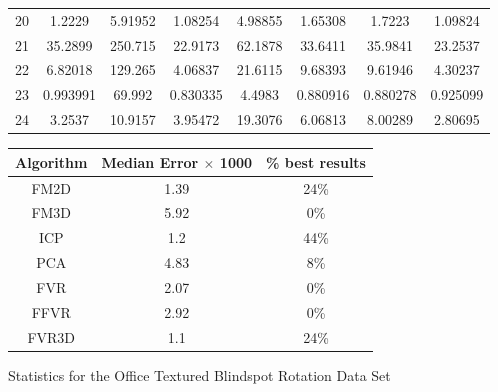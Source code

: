 \begin{figure}
\begin{tabular}{cccccccc}
20 & 1.2229 & 5.91952 & 1.08254 & 4.98855 & 1.65308 & 1.7223 & 1.09824\\
21 & 35.2899 & 250.715 & 22.9173 & 62.1878 & 33.6411 & 35.9841 & 23.2537\\
22 & 6.82018 & 129.265 & 4.06837 & 21.6115 & 9.68393 & 9.61946 & 4.30237\\
23 & 0.993991 & 69.992 & 0.830335 & 4.4983 & 0.880916 & 0.880278 & 0.925099\\
24 & 3.2537 & 10.9157 & 3.95472 & 19.3076 & 6.06813 & 8.00289 & 2.80695\\
\end{tabular}
\vspace{10mm}
\centering
\begin{tabular}{ccc}
\hline
\textbf{Algorithm} & \textbf{Median Error $\times$ 1000} & \textbf{\% best results}\\ \hline
FM2D	& 1.39 & 24\%\\
FM3D	& 5.92 & 0\%\\
ICP	& 1.2 & 44\%\\
PCA	& 4.83 & 8\%\\
FVR	& 2.07 & 0\%\\
FFVR	& 2.92 & 0\%\\
FVR3D	& 1.1 & 24\%\\
\end{tabular}
\caption{Statistics for the Office Textured Blindspot Rotation Data Set}
\label{tab:officetexturedblindspotrotation}
\end{figure} 


